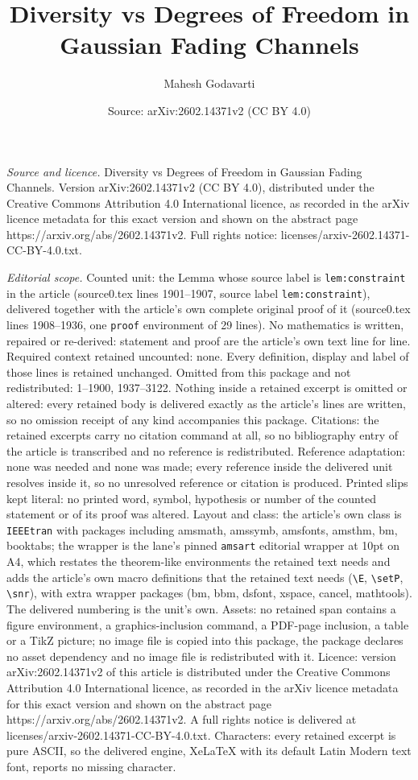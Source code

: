 \documentclass[10pt,a4paper]{amsart}
\title[Diversity vs Degrees of Freedom in Gaussian Fading Channels]{Diversity vs Degrees of Freedom in Gaussian Fading Channels}
\author{Mahesh Godavarti}
\date{Source: arXiv:2602.14371v2 (CC BY 4.0)}
\begin{document}
\maketitle

\noindent\emph{Source and licence.} Diversity vs Degrees of Freedom in Gaussian Fading Channels. Version arXiv:2602.14371v2 (CC BY 4.0), distributed under the Creative Commons Attribution 4.0 International licence, as recorded in the arXiv licence metadata for this exact version and shown on the abstract page https://arxiv.org/abs/2602.14371v2. Full rights notice: licenses/arxiv-2602.14371-CC-BY-4.0.txt.\par\smallskip

\noindent\textit{Editorial scope.} Counted unit: the Lemma whose source label is \texttt{lem:constraint} in the article (source0.tex lines 1901--1907, source label \texttt{lem:constraint}), delivered together with the article's own complete original proof of it (source0.tex lines 1908--1936, one \texttt{proof} environment of 29 lines). No mathematics is written, repaired or re-derived: statement and proof are the article's own text line for line. Required context retained uncounted: none. Every definition, display and label of those lines is retained unchanged. Omitted from this package and not redistributed: 1--1900, 1937--3122. Nothing inside a retained excerpt is omitted or altered: every retained body is delivered exactly as the article's lines are written, so no omission receipt of any kind accompanies this package. Citations: the retained excerpts carry no citation command at all, so no bibliography entry of the article is transcribed and no reference is redistributed. Reference adaptation: none was needed and none was made; every reference inside the delivered unit resolves inside it, so no unresolved reference or citation is produced. Printed slips kept literal: no printed word, symbol, hypothesis or number of the counted statement or of its proof was altered. Layout and class: the article's own class is \texttt{IEEEtran} with packages including amsmath, amssymb, amsfonts, amsthm, bm, booktabs; the wrapper is the lane's pinned \texttt{amsart} editorial wrapper at 10pt on A4, which restates the theorem-like environments the retained text needs and adds the article's own macro definitions that the retained text needs (\texttt{\textbackslash E}, \texttt{\textbackslash setP}, \texttt{\textbackslash snr}), with extra wrapper packages (bm, bbm, dsfont, xspace, cancel, mathtools). The delivered numbering is the unit's own. Assets: no retained span contains a figure environment, a graphics-inclusion command, a PDF-page inclusion, a table or a TikZ picture; no image file is copied into this package, the package declares no asset dependency and no image file is redistributed with it. Licence: version arXiv:2602.14371v2 of this article is distributed under the Creative Commons Attribution 4.0 International licence, as recorded in the arXiv licence metadata for this exact version and shown on the abstract page https://arxiv.org/abs/2602.14371v2. A full rights notice is delivered at licenses/arxiv-2602.14371-CC-BY-4.0.txt. Characters: every retained excerpt is pure ASCII, so the delivered engine, XeLaTeX with its default Latin Modern text font, reports no missing character.
\end{document}
